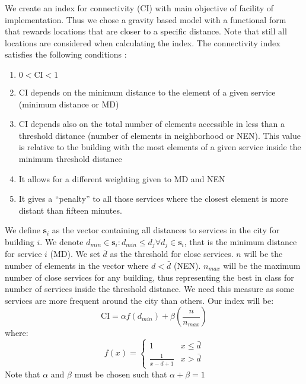 \documentclass[11pt, titlepage]{article}
\begin{document}
We create an index for connectivity (CI) with main objective of facility of implementation. Thus we chose a gravity based model with a functional form that rewards locations that are closer to a specific distance. Note that still all locations are considered when calculating the index. The connectivity index satisfies the following conditions :
	\begin{enumerate}
		\item $0<\text{CI}<1$
		\item CI depends on the minimum distance to the element of a given service (minimum distance or MD)
		\item CI depends also on  the total number of elements accessible in less than a threshold distance (number of elements in neighborhood or NEN). This value is relative to the building with the most elements of a given service inside the minimum threshold distance
		\item It allows for a different weighting given to MD and NEN
		\item It gives a ``penalty'' to all those services where the closest element is more distant than fifteen minutes.
	\end{enumerate}
	We define $\boldsymbol{s}_i$ as the vector containing all distances to services in the city for building $i$. We denote $d_{min} \in \boldsymbol{s}_i: d_{min}\leq d_j \forall d_j \in  \boldsymbol{s}_i$, that is the minimum distance for service $i$ (MD). We set $\bar{d}$ as the threshold for close services. $n$ will be the number of elements in the vector where $d<\bar{d}$ (NEN). $n_{max}$ will be the maximum number of close services for any building, thus representing the best in class for number of services inside the threshold distance. We need this measure as some services are more frequent around the city than others. Our index will be:
	\begin{equation}
		\text{CI}=\alpha f\left(d_{min}\right)+\beta \left(\frac{n}{n_{max}}\right)
	\end{equation}
	where:
	\begin{equation*}
		f(x)=
		\begin{cases} 
			1 & x\leq \bar{d} \\
			\frac{1}{x-\bar{d}+1} & x>\bar{d}
		\end{cases}
	\end{equation*}
 Note that $\alpha$ and $\beta$ must be chosen such that $\alpha+\beta=1$
 
\end{document}
